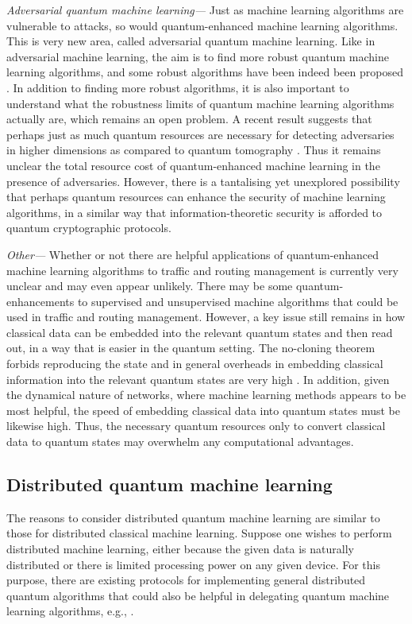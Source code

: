 \documentclass[twocolumn, aps, rmp, amsmath, amssymb, nofootinbib, superscriptaddress, longbibliography, floatfix, table-of-contents, eqsecnum]{revtex4-2}
\begin{document}
\textit{Adversarial quantum machine learning---} Just as machine learning algorithms are vulnerable to attacks, so would quantum-enhanced machine learning algorithms. This is very new area, called adversarial quantum machine learning. Like in adversarial machine learning, the aim is to find more robust quantum machine learning algorithms, and some robust algorithms have been indeed been proposed \cite{wiebe2018hardening}. In addition to finding more robust algorithms, it is also important to understand what the robustness limits of quantum machine learning algorithms actually are, which remains an open problem. A recent result suggests that perhaps just as much quantum resources are necessary for detecting adversaries in higher dimensions as compared to quantum tomography \cite{advql}. Thus it remains unclear the total resource cost of quantum-enhanced machine learning in the presence of adversaries. However, there is a tantalising yet unexplored possibility that perhaps quantum resources can enhance the security of machine learning algorithms, in a similar way that information-theoretic security is afforded to quantum cryptographic protocols.

\textit{Other---} Whether or not there are helpful applications of quantum-enhanced machine learning algorithms to traffic and routing management is currently very unclear and may even appear unlikely. There may be some quantum-enhancements to supervised and unsupervised machine algorithms that could be used in traffic and routing management. However, a key issue still remains in how classical data can be embedded into the relevant quantum states and then read out, in a way that is easier in the quantum setting. The no-cloning theorem forbids reproducing the state and in general overheads in embedding classical information into the relevant quantum states are very high \cite{giovannetti2008quantum, giovannetti2008architectures}. In addition, given the dynamical nature of networks, where machine learning methods appears to be most helpful, the speed of embedding classical data into quantum states must be likewise high. Thus, the necessary quantum resources only to convert classical data to quantum states may overwhelm any computational advantages. 

\subsection{Distributed quantum machine learning}
The reasons to consider distributed quantum machine learning are similar to those for distributed classical machine learning. Suppose one wishes to perform distributed machine learning, either because the given data is naturally distributed or there is limited processing power on any given device. For this purpose, there are existing protocols for implementing general distributed quantum algorithms that could also be helpful in delegating quantum machine learning algorithms, e.g., \cite{beals2013efficient}.
\end{document}
